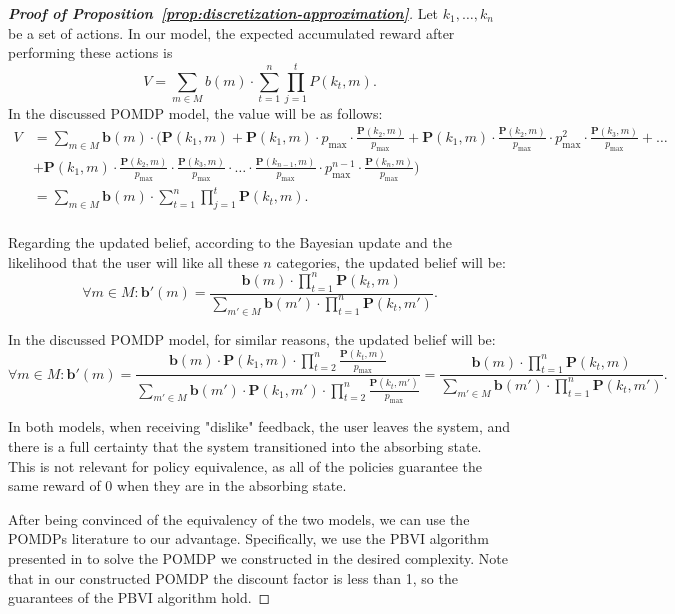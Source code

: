\begin{proof}[\normalfont\bfseries Proof of Proposition~\ref{prop:discretization-approximation}]
  Let $k_1, \ldots, k_n$ be a set of actions. In our model, the expected accumulated reward after performing these actions is
  \[
    V = \sum_{m \in M} b(m) \cdot \sum_{t=1}^{n} \prod_{j=1}^{t} P(k_t, m).
  \]
  In the discussed POMDP model, the value will be as follows:
  \begin{align*}
    V & = \sum_{m \in M} \bm b(m) \cdot ( \bm P(k_1, m) + \bm P(k_1, m) \cdot p_{\max} \cdot \frac{\bm P(k_2, m)}{p_{\max}} + \bm P(k_1, m) \cdot \frac{\bm P(k_2, m)}{p_{\max}} \cdot p_{\max}^2 \cdot \frac{\bm P(k_3, m)}{p_{\max}} + \ldots \\
      & + \bm P(k_1, m) \cdot \frac{\bm P(k_2, m)}{p_{\max}} \cdot \frac{\bm P(k_3, m)}{p_{\max}} \cdot \ldots \cdot \frac{\bm P(k_{n-1}, m)}{p_{\max}} \cdot p_{\max}^{n-1} \cdot \frac{\bm P(k_n, m)}{p_{\max}} )      \\
      & =  \sum_{m \in M}\bm  b(m) \cdot \sum_{t=1}^{n} \prod_{j=1}^{t} \bm P(k_t, m).  \\
  \end{align*}

  Regarding the updated belief, according to the Bayesian update and the likelihood that the user will like all these $n$ categories, the updated belief will be:
  \[
    \forall m \in M: \bm b'(m) = \frac{\bm b(m) \cdot \prod_{t=1}^{n} \bm P(k_t, m)}{\sum_{m' \in M} \bm b(m') \cdot \prod_{t=1}^{n} \bm P(k_t, m')}.
  \]

  In the discussed POMDP model, for similar reasons, the updated belief will be:
  \[
    \forall m \in M: \bm b'(m) = \frac{\bm b(m) \cdot \bm P(k_1, m) \cdot \prod_{t=2}^{n} \frac{\bm P(k_t, m)}{p_{\max}}}{\sum_{m' \in M} \bm b(m') \cdot \bm P(k_1, m') \cdot \prod_{t=2}^{n} \frac{\bm P(k_t, m')}{p_{\max}}} = \frac{\bm b(m) \cdot \prod_{t=1}^{n} \bm P(k_t, m)}{\sum_{m' \in M} \bm b(m') \cdot \prod_{t=1}^{n} \bm P(k_t, m')}.
  \]

  In both models, when receiving "dislike" feedback, the user leaves the system, and there is a full certainty that the system transitioned into the absorbing state. This is not relevant for policy equivalence, as all of the policies guarantee the same reward of $0$ when they are in the absorbing state.

  After being convinced of the equivalency of the two models, we can use the POMDPs literature to our advantage.
  Specifically, we use the PBVI algorithm presented in \citet{point-based-value-iteration-an-anytime-algorithm-for-pomdps} to solve the POMDP we constructed in the desired complexity.
  Note that in our constructed POMDP the discount factor is less than 1, so the guarantees of the PBVI algorithm hold.


\end{proof}
